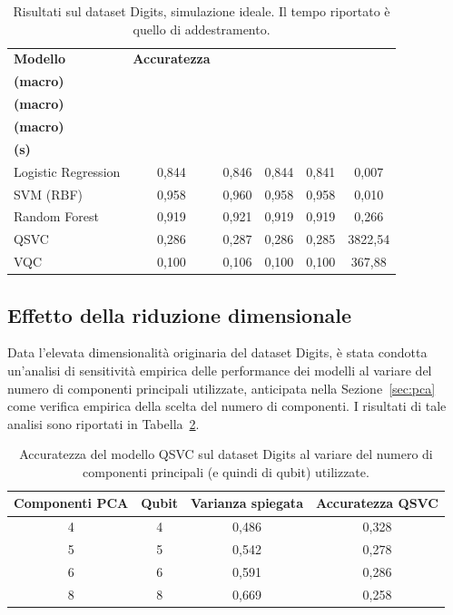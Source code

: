 \begin{table}[htbp]
\centering
\caption{Risultati sul dataset Digits, simulazione ideale. Il tempo riportato è quello di addestramento.}
\label{tab:risultati_digits_ideale}
{\renewcommand{\arraystretch}{1.5} %
\footnotesize
\begin{tabular}{>{\raggedright\arraybackslash}p{2.2cm}ccccc}
\toprule
\textbf{Modello} & \textbf{Accuratezza} & \thead{\textbf{Precisione}\\\textbf{(macro)}} & \thead{\textbf{Richiamo}\\\textbf{(macro)}} & \thead{\textbf{F1-score}\\\textbf{(macro)}} & \thead{\textbf{Tempo}\\\textbf{(s)}} \\
\midrule
Logistic Regression & 0,844 & 0,846 & 0,844 & 0,841 & 0,007 \\
SVM (RBF) & 0,958 & 0,960 & 0,958 & 0,958 & 0,010 \\
Random Forest & 0,919 & 0,921 & 0,919 & 0,919 & 0,266 \\
QSVC & 0,286 & 0,287 & 0,286 & 0,285 & 3822,54 \\
VQC & 0,100 & 0,106 & 0,100 & 0,100 & 367,88 \\
\bottomrule
\end{tabular}
}
\end{table}

\subsection{Effetto della riduzione dimensionale}
Data l'elevata dimensionalità originaria del dataset Digits, è stata condotta un'analisi di sensitività empirica delle performance dei modelli al variare del numero di componenti principali utilizzate, anticipata nella Sezione~\ref{sec:pca} come verifica empirica della scelta del numero di componenti. I risultati di tale analisi sono riportati in Tabella~\ref{tab:digits_sensitivity_pca}.

\begin{table}[htbp]
\centering
\caption{Accuratezza del modello QSVC sul dataset Digits al variare del numero di componenti principali (e quindi di qubit) utilizzate.}
\label{tab:digits_sensitivity_pca}
\begin{tabular}{cccc}
\toprule
\textbf{Componenti PCA} & \textbf{Qubit} & \textbf{Varianza spiegata} & \textbf{Accuratezza QSVC} \\
\midrule
4 & 4 & 0,486 & 0,328 \\
5 & 5 & 0,542 & 0,278 \\
6 & 6 & 0,591 & 0,286 \\
8 & 8 & 0,669 & 0,258 \\
\bottomrule
\end{tabular}
\end{table}

